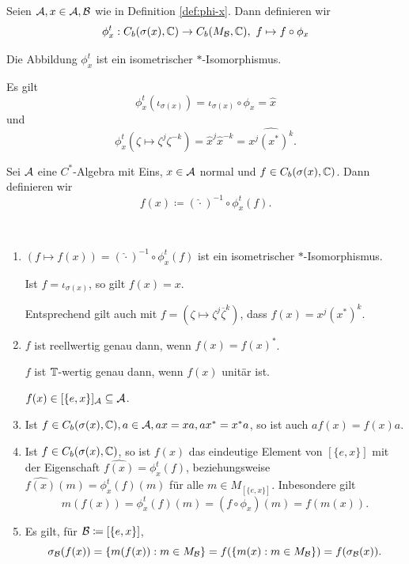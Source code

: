 \begin{definition}
    Seien $\mathcal{A}, x \in \mathcal{A}, \mathcal{B}$ wie in Definition \ref{def:phi-x}. Dann definieren wir
    \begin{equation*}
        \phi_x^t : C_b(\sigma(x), \mathbb{C}) \to C_b(M_{\mathcal{B}}, \mathbb{C}), \ f \mapsto f \circ \phi_x
    \end{equation*}
\end{definition}

\begin{lemma}
    Die Abbildung $\phi_x^t$ ist ein isometrischer $\ast$-Isomorphismus.
\end{lemma}

\begin{remark}
    Es gilt
    $$ \phi_x^t(\iota_{\sigma(x)}) = \iota_{\sigma(x)} \circ \phi_x = \hat{x} $$
    und
    $$ \phi_x^t(\zeta \mapsto \zeta^j \zeta^{-k}) = \hat{x}^j \hat{x}^{-k} = \widehat{x^j (x^*)^k}. $$
\end{remark}

\begin{definition}
    Sei $\mathcal{A}$ eine $C^*$-Algebra mit Eins, $x \in \mathcal{A}$ normal und $f \in C_b(\sigma(x), \mathbb{C})$. Dann definieren wir
    $$ f(x) \coloneqq (\hat{\cdot})^{-1} \circ \phi_x^t(f). $$
\end{definition}

\begin{remark}{\ }
    \begin{enumerate}
        \item $(f \mapsto f(x)) = (\hat{\cdot})^{-1} \circ \phi_x^t(f)$ ist ein isometrischer $\ast$-Isomorphismus.
        
        Ist $f = \iota_{\sigma(x)}$, so gilt $f(x) = x$.
        
        Entsprechend gilt auch mit $f = (\zeta \mapsto \zeta^j \overline{\zeta}^k)$, dass $f(x) = x^j (x^*)^k$.

        \item $f$ ist reellwertig genau dann, wenn $f(x) = f(x)^*$.
        
        $f$ ist $\mathbb{T}$-wertig genau dann, wenn $f(x)$ unitär ist.

        $f(x) \in [\{ e, x \}]_{\mathcal{A}} \subseteq \mathcal{A}$.

        \item Ist $f \in C_b(\sigma(x), \mathbb{C}), a \in \mathcal{A}, ax = xa, ax^* = x^* a$, so ist auch $af(x) = f(x) a$.
        
        \item Ist $f \in C_b(\sigma(x), \mathbb{C})$, so ist $f(x)$ das eindeutige Element von $[\{e, x\}]$ mit der Eigenschaft $\widehat{f(x)} = \phi_x^t(f)$, beziehungsweise $\widehat{f(x)}(m) = \phi_x^t(f)(m)$ für alle $m \in M_{[\{e,x\}]}$. Inbesondere gilt
        $$ m(f(x)) = \phi_x^t(f)(m) = (f \circ \phi_x)(m) = f(m(x)). $$

        \item Es gilt, für $\mathcal{B} \coloneqq [\{e, x\}]$,
        $$ \sigma_{\mathcal{B}} (f(x)) = \{ m(f(x)) : m \in M_{\mathcal{B}} \} = f(\{ m(x) : m \in M_{\mathcal{B}} \}) = f(\sigma_{\mathcal{B}} (x)). $$
    \end{enumerate}
\end{remark}

